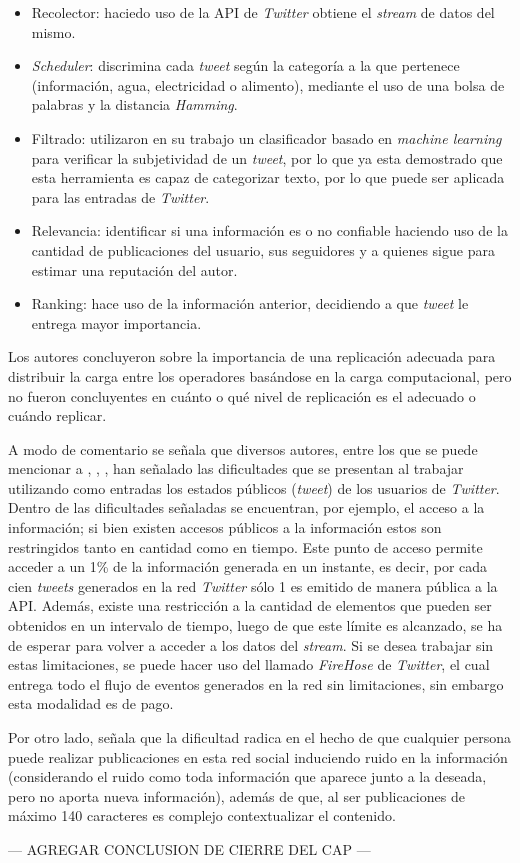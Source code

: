 \begin{itemize}
\item Recolector: haciedo uso de la API de \textit{Twitter} obtiene el \textit{stream} de datos del mismo. 
\item \textit{Scheduler}: discrimina cada \textit{tweet} según la categoría a la que pertenece (información, agua, electricidad o alimento), mediante el uso de una bolsa de palabras y la distancia \textit{Hamming}.
\item Filtrado: utilizaron en su trabajo un clasificador basado en \textit{machine learning} para verificar la subjetividad de un \textit{tweet}, por lo que ya esta demostrado que esta herramienta es capaz de categorizar texto, por lo que puede ser aplicada para las entradas de \textit{Twitter}.
\item Relevancia: identificar si una información es o no confiable haciendo uso de la cantidad de publicaciones del usuario, sus seguidores y a quienes sigue para estimar una reputación del autor.
\item Ranking: hace uso de la información anterior, decidiendo a que \textit{tweet} le entrega mayor importancia.
\end{itemize}

Los autores concluyeron sobre la importancia de una replicación adecuada para distribuir la carga entre los operadores basándose en la carga computacional, pero no fueron concluyentes en cuánto o qué nivel de replicación es el adecuado o cuándo replicar.

A modo de comentario se señala que diversos autores, entre los que se puede mencionar a \citep{VanDeVoort}, \citep{EventDetectionInTwitter}, \citep{Maldonado}, han señalado las dificultades que se presentan al trabajar utilizando como entradas los estados públicos (\textit{tweet}) de los usuarios de \textit{Twitter}. Dentro de las dificultades señaladas se encuentran, por ejemplo, el acceso a la información; si bien existen accesos públicos a la información estos son restringidos tanto en cantidad como en tiempo. Este punto de acceso permite acceder a un 1\% de la información generada en un instante, es decir, por cada cien \textit{tweets} generados en la red \textit{Twitter} sólo 1 es emitido de manera pública a la API. Además, existe una restricción a la cantidad de elementos que pueden ser obtenidos en un intervalo de tiempo, luego de que este límite es alcanzado, se ha de esperar para volver a acceder a los datos del \textit{stream}. Si se desea trabajar sin estas limitaciones, se puede hacer uso del llamado \textit{FireHose} de \textit{Twitter}, el cual entrega todo el flujo de eventos generados en la red sin limitaciones, sin embargo esta modalidad es de pago.

Por otro lado, \citep{VanDeVoort} señala que la dificultad radica en el hecho de que cualquier persona puede realizar publicaciones en esta red social induciendo ruido en la información (considerando el ruido como toda información que aparece junto a la deseada, pero no aporta nueva información), además de que, al ser publicaciones de máximo 140 caracteres es complejo contextualizar el contenido.

--- AGREGAR CONCLUSION DE CIERRE DEL CAP ---
